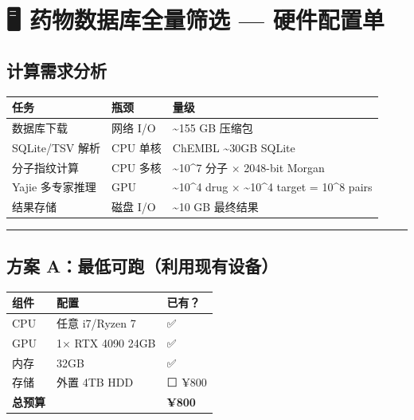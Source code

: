 \documentclass[
  12pt,
]{ctexart}
\author{SCX}
\date{2026}
\begin{document}
\section{🖥️ 药物数据库全量筛选 ---
硬件配置单}\label{ux836fux7269ux6570ux636eux5e93ux5168ux91cfux7b5bux9009-ux786cux4ef6ux914dux7f6eux5355}

\subsection{计算需求分析}\label{ux8ba1ux7b97ux9700ux6c42ux5206ux6790}

\begin{longtable}[]{@{}lll@{}}
\toprule\noalign{}
任务 & 瓶颈 & 量级 \\
\midrule\noalign{}
\endhead
\bottomrule\noalign{}
\endlastfoot
12 数据库下载 & 网络 I/O & \textasciitilde155 GB 压缩包 \\
SQLite/TSV 解析 & CPU 单核 & ChEMBL \textasciitilde30GB SQLite \\
分子指纹计算 & CPU 多核 & \textasciitilde10\^{}7 分子 × 2048-bit
Morgan \\
Yajie 多专家推理 & GPU & \textasciitilde10\^{}4 drug ×
\textasciitilde10\^{}4 target = 10\^{}8 pairs \\
结果存储 & 磁盘 I/O & \textasciitilde10 GB 最终结果 \\
\end{longtable}

\begin{center}\rule{0.5\linewidth}{0.5pt}\end{center}

\subsection{方案
A：最低可跑（利用现有设备）}\label{ux65b9ux6848-aux6700ux4f4eux53efux8dd1ux5229ux7528ux73b0ux6709ux8bbeux5907}

\begin{longtable}[]{@{}lll@{}}
\toprule\noalign{}
组件 & 配置 & 已有？ \\
\midrule\noalign{}
\endhead
\bottomrule\noalign{}
\endlastfoot
CPU & 任意 i7/Ryzen 7 & ✅ \\
GPU & 1× RTX 4090 24GB & ✅ \\
内存 & 32GB & ✅ \\
存储 & 外置 4TB HDD & ⬜ ¥800 \\
\textbf{总预算} & & \textbf{¥800} \\
\end{longtable}
\end{document}
